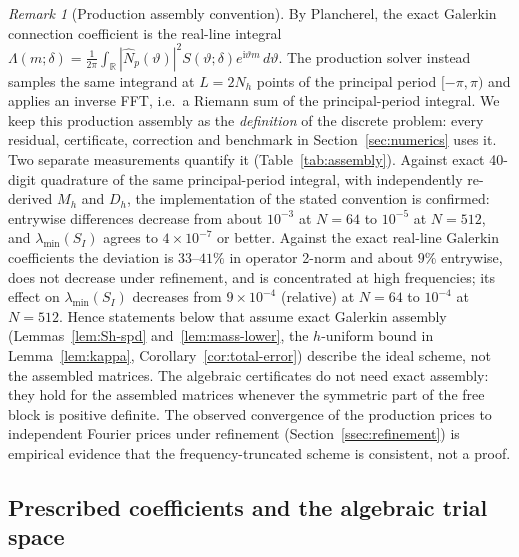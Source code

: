 \documentclass[11pt]{amsart}
\theoremstyle{remark}
\newtheorem{remark}[theorem]{Remark}
\newcommand{\R}{\mathbb{R}}
\begin{document}
\begin{remark}[Production assembly convention]
\label{rem:assembly-convention}
By Plancherel, the exact Galerkin connection coefficient is the real-line
integral
$\Lambda(m;\delta)=\frac1{2\pi}\int_{\R}|\widehat N_p(\vartheta)|^2
S(\vartheta;\delta)e^{\mathrm i\vartheta m}\,d\vartheta$.
The production solver instead samples the same integrand at $L=2N_h$ points of
the principal period $[-\pi,\pi)$ and applies an inverse FFT, i.e.\ a
Riemann sum of the principal-period integral. We keep this production
assembly as the \emph{definition} of the discrete problem: every residual,
certificate, correction and benchmark in Section~\ref{sec:numerics} uses it.
Two separate measurements quantify it (Table~\ref{tab:assembly}). Against
exact 40-digit quadrature of the same principal-period integral, with
independently re-derived $M_h$ and $D_h$, the implementation of the stated
convention is confirmed: entrywise differences decrease from about
$10^{-3}$ at $N=64$ to $10^{-5}$ at $N=512$, and $\lambda_{\min}(S_I)$
agrees to $4\times10^{-7}$ or better. Against the exact real-line Galerkin
coefficients the deviation is $33$--$41\%$ in operator 2-norm and about
$9\%$ entrywise, does not decrease under refinement, and is concentrated at
high frequencies; its effect on $\lambda_{\min}(S_I)$ decreases from
$9\times10^{-4}$ (relative) at $N=64$ to $10^{-4}$ at $N=512$. Hence
statements below that assume exact Galerkin assembly
(Lemmas~\ref{lem:Sh-spd} and~\ref{lem:mass-lower}, the $h$-uniform bound in
Lemma~\ref{lem:kappa}, Corollary~\ref{cor:total-error}) describe the ideal
scheme, not the assembled matrices. The algebraic certificates do not need
exact assembly: they hold for the assembled matrices whenever the symmetric
part of the free block is positive definite. The observed convergence of the
production prices to independent Fourier prices under refinement
(Section~\ref{ssec:refinement}) is empirical evidence that the
frequency-truncated scheme is consistent, not a proof.
\end{remark}

\subsection{Prescribed coefficients and the algebraic trial space}
\label{ssec:constrained-system}
\end{document}
